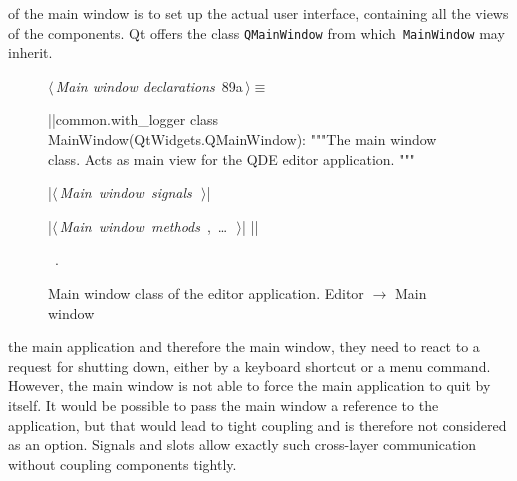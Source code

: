 \documentclass[%
    a4paper,    %
    justified,  %
    nobib,      %
    openany     %
]{tufte-book}
\makeatletter
\renewcommand{\label}[1]{\@tufte@label{##1}}%
\makeatother
\begin{document}
 of the main window is to set up the actual
user interface, containing all the views of the components. Qt offers the class
\verb=QMainWindow= from which~\verb=MainWindow= may inherit.

\begin{figure}[!htpb]
\begin{flushleft} \small
\begin{minipage}{\linewidth}\label{scrap15}\raggedright\small
{} $\langle\,${\itshape Main window declarations}\nobreak\ {\footnotesize {89a}}$\,\rangle\equiv$
\vspace{-1ex}
\begin{pythoncode}
|\normalfont{}\fontfamily{}|common.with_logger
class MainWindow(QtWidgets.QMainWindow):
    """The main window class.
    Acts as main view for the QDE editor application.
    """

    |\hbox{$\langle\,${\itshape Main window signals}\nobreak\ {\footnotesize {}}$\,\rangle$}|

    |\hbox{$\langle\,${\itshape Main window methods}\nobreak\ {\footnotesize {}, \ldots\ }$\,\rangle$}|
|\NWsep|
\end{pythoncode}
\vspace{1.5ex}
\footnotesize
\begin{list}{}{\setlength{\itemsep}{-\parsep}\setlength{\itemindent}{-\leftmargin}}
\item \NWtxtMacroRefIn\ .

\item{}
\end{list}
\end{minipage}\vspace{4ex}
\end{flushleft}
\caption{Main window class of the editor application.
  \newline{}\newline{}Editor $\rightarrow$ Main window}
\end{figure}

 the main application and therefore the
main window, they need to react to a request for shutting down, either by a
keyboard shortcut or a menu command. However, the main window is not able to
force the main application to quit by itself. It would be possible to pass the
main window a reference to the application, but that would lead to tight
coupling and is therefore not considered as an option. Signals and slots allow
exactly such cross-layer communication without coupling components tightly.
\end{document}
